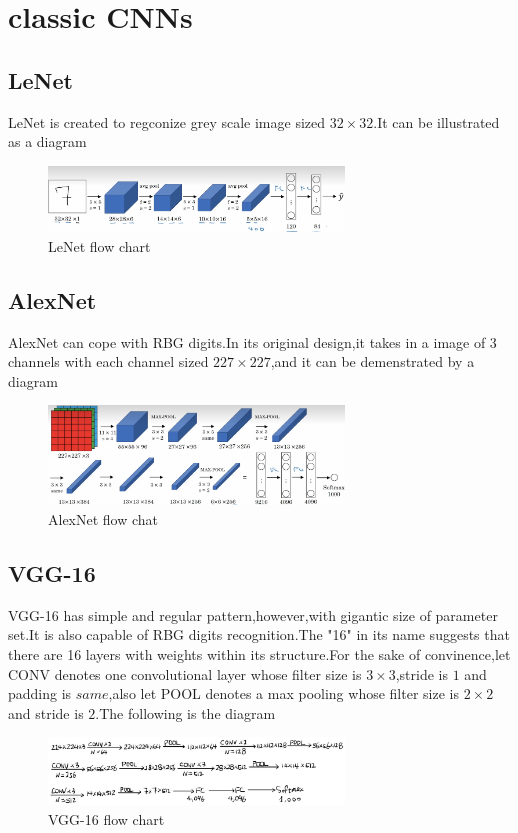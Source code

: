 \documentclass{article}
\begin{document}
\section{classic CNNs}
\subsection{LeNet}
LeNet is created to regconize grey scale image sized $32\times32$.It can be illustrated as a diagram
\begin{figure}[htbp]
	\centering
	\includegraphics[width=0.7\textwidth]{5.png}
	\caption{LeNet flow chart}
\end{figure}
\vspace{0.1\textheight}
\subsection{AlexNet}
AlexNet can cope with RBG digits.In its original design,it takes in a image of 3 channels with each channel sized $227\times227$,and it can be demenstrated by a diagram
\begin{figure}[htbp]
	\centering
	\includegraphics[width=0.7\textwidth]{6.png}
	\caption{AlexNet flow chat}
\end{figure}
\vspace{0.1\textheight}
\subsection{VGG-16}
VGG-16 has simple and regular pattern,however,with gigantic size of parameter set.It is also capable of RBG digits recognition.The "16" in its name suggests that there are 16 layers with weights within its structure.For the sake of convinence,let CONV denotes one convolutional layer whose filter size is $3\times3$,stride is $1$ and padding is $same$,also let POOL denotes a max pooling whose filter size is $2\times2$ and stride is $2$.The following is the diagram
\begin{figure}[htbp]
	\centering
	\includegraphics[width=0.7\textwidth]{7.jpg}
	\caption{VGG-16 flow chart}
\end{figure}
\end{document}
